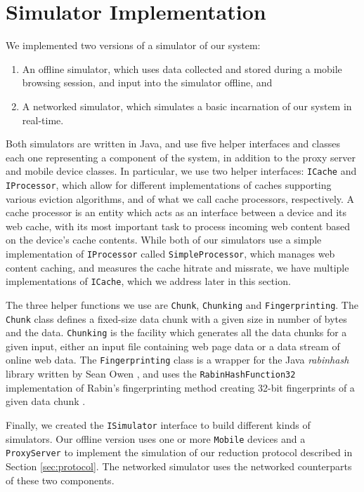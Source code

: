 \section{Simulator Implementation}
We implemented two versions of a simulator of our system: 
\begin{enumerate}
\item An offline simulator, which uses data collected and stored during a mobile browsing session, and input into the simulator offline, and
\item A networked simulator, which simulates a basic incarnation of our system in real-time.
\end{enumerate}
Both simulators are written in Java, and use five helper interfaces and classes each one representing a component of the system, in addition to the proxy server and mobile device classes. In particular, we use two helper interfaces: \texttt{ICache} and \texttt{IProcessor}, which allow for different implementations of caches supporting various eviction algorithms, and of what we call cache processors, respectively. A cache processor is an entity which acts as an interface between a device and its web cache, with its most important task to process incoming web content based on the device's cache contents. While both of our simulators use a simple implementation of \texttt{IProcessor} called \texttt{SimpleProcessor}, which manages web content caching, and measures the cache hitrate and missrate, we have multiple implementations of \texttt{ICache}, which we address later in this section. 

The three helper functions we use are \texttt{Chunk}, \texttt{Chunking} and \texttt{Fingerprinting}. The \texttt{Chunk} class defines a fixed-size data chunk with a given size in number of bytes and the data. \texttt{Chunking} is the facility which generates all the data chunks for a given input, either an input file containing web page data or a data stream of online web data. The \texttt{Fingerprinting} class is a wrapper for the Java \emph{rabinhash} library written by Sean Owen \cite{rabinhash}, and uses the \texttt{RabinHashFunction32} implementation of Rabin's fingerprinting method creating 32-bit fingerprints of a given data chunk \cite{rabin_api}.

Finally, we created the \texttt{ISimulator} interface to build different kinds of simulators. Our offline version uses one or more \texttt{Mobile} devices and a \texttt{ProxyServer} to implement the simulation of our reduction protocol described in Section \ref{sec:protocol}. The networked simulator uses the networked counterparts of these two components.



